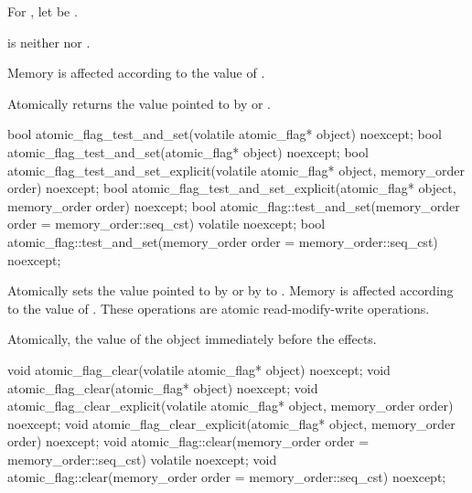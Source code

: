 \begin{itemdescr}
\pnum
For , let  be .

\pnum
\expects
{} is
neither  nor .

\pnum
\effects
Memory is affected according to the value of .

\pnum
\returns
Atomically returns the value pointed to by  or .
\end{itemdescr}

%
%
%
\begin{itemdecl}
bool atomic_flag_test_and_set(volatile atomic_flag* object) noexcept;
bool atomic_flag_test_and_set(atomic_flag* object) noexcept;
bool atomic_flag_test_and_set_explicit(volatile atomic_flag* object, memory_order order) noexcept;
bool atomic_flag_test_and_set_explicit(atomic_flag* object, memory_order order) noexcept;
bool atomic_flag::test_and_set(memory_order order = memory_order::seq_cst) volatile noexcept;
bool atomic_flag::test_and_set(memory_order order = memory_order::seq_cst) noexcept;
\end{itemdecl}

\begin{itemdescr}
\pnum
\effects
Atomically sets the value pointed to by  or by  to . Memory is affected according to the value of
. These operations are atomic read-modify-write operations.

\pnum
\returns
Atomically, the value of the object immediately before the effects.
\end{itemdescr}

%
%
%
\begin{itemdecl}
void atomic_flag_clear(volatile atomic_flag* object) noexcept;
void atomic_flag_clear(atomic_flag* object) noexcept;
void atomic_flag_clear_explicit(volatile atomic_flag* object, memory_order order) noexcept;
void atomic_flag_clear_explicit(atomic_flag* object, memory_order order) noexcept;
void atomic_flag::clear(memory_order order = memory_order::seq_cst) volatile noexcept;
void atomic_flag::clear(memory_order order = memory_order::seq_cst) noexcept;
\end{itemdecl}

